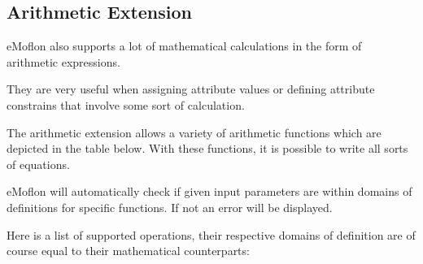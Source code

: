 {%








\subsection{Arithmetic Extension}

eMoflon also supports a lot of mathematical calculations in the form of arithmetic expressions.

They are very useful when assigning attribute values or defining attribute constrains that involve some sort of calculation.\newline

The arithmetic extension allows a variety of arithmetic functions which are depicted in the table below. With these functions, it is possible to write all sorts of equations.

eMoflon will automatically check if given input parameters are within domains of definitions for specific functions. If not an error will be displayed.\newline

Here is a list of supported operations, their respective domains of definition are of course equal to their mathematical counterparts:

}
